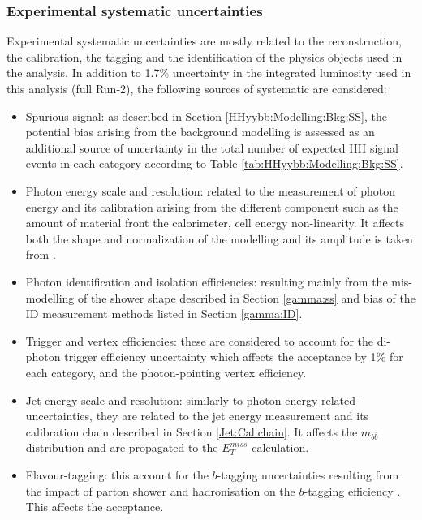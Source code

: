 \subsubsection{Experimental systematic uncertainties}
\label{HHyybb:Syst:Exp}
Experimental systematic uncertainties are mostly related to the reconstruction, the calibration, the tagging and the identification of the physics objects used in the analysis. In addition to 1.7\% uncertainty in the integrated luminosity used in this analysis (full Run-2), the following sources of systematic are considered: 
\begin{itemize}
    \item Spurious signal: as described in Section \ref{HHyybb:Modelling:Bkg:SS}, the potential bias arising from the background modelling is assessed as an additional source of uncertainty in the total number of expected HH signal events in each category according to Table \ref{tab:HHyybb:Modelling:Bkg:SS}.
    \item Photon energy scale and resolution: related to the measurement of photon energy and its calibration arising from the different component such as the amount of material front the calorimeter, cell energy non-linearity. It affects both the shape and normalization of the modelling and its amplitude is taken from \cite{PES}.
    \item Photon identification and isolation efficiencies: resulting mainly from the mis-modelling of the shower shape described in Section \ref{gamma:ss} and bias of the ID measurement methods listed in Section \ref{gamma:ID}. 
    \item Trigger and vertex efficiencies: these are considered to account for the di-photon trigger efficiency uncertainty which affects the acceptance by 1\% for each category, and the photon-pointing vertex efficiency.
    \item Jet energy scale and resolution: similarly to photon energy related-uncertainties, they are related to the jet energy measurement and its calibration chain described in Section \ref{Jet:Cal:chain}. It affects the $m_{b\bar{b}}$ distribution and are propagated to the $E_{T}^{miss}$ calculation. 
    \item Flavour-tagging: this account for the $b$-tagging uncertainties resulting from the impact of parton shower and hadronisation on the $b$-tagging efficiency \cite{IP2}. This affects the acceptance.
\end{itemize}

